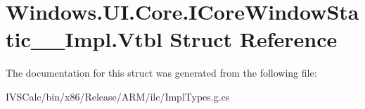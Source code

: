 \hypertarget{struct_windows_1_1_u_i_1_1_core_1_1_i_core_window_static_____impl_1_1_vtbl}{}\section{Windows.\+U\+I.\+Core.\+I\+Core\+Window\+Static\+\_\+\+\_\+\+Impl.\+Vtbl Struct Reference}
\label{struct_windows_1_1_u_i_1_1_core_1_1_i_core_window_static_____impl_1_1_vtbl}


The documentation for this struct was generated from the following file\+:\begin{DoxyCompactItemize}
\item 
I\+V\+S\+Calc/bin/x86/\+Release/\+A\+R\+M/ilc/Impl\+Types.\+g.\+cs\end{DoxyCompactItemize}
